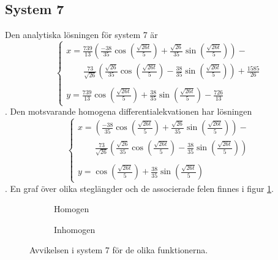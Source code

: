 \subsection{System 7}
Den analytiska lösningen för system 7 är
\begin{equation*}
    \begin{cases}
        x=\frac{739}{13}(\frac{-38}{35}\cos(\frac{\sqrt{26t}}{5})+\frac{\sqrt{26}}{35}\sin(\frac{\sqrt{26t}}{5}))-\\
        \qquad \frac{73}{\sqrt{26}}(\frac{\sqrt{26}}{35}\cos(\frac{\sqrt{26t}}{5})-\frac{38}{35}\sin(\frac{\sqrt{26t}}{5}))+\frac{1585}{26}\\
        \\[-7.5pt]
        y=\frac{739}{13}\cos(\frac{\sqrt{26t}}{5})+\frac{38}{35}\sin(\frac{\sqrt{26t}}{5})-\frac{726}{13}
    \end{cases}
\end{equation*}. Den motsvarande homogena differentialekvationen har lösningen 
\begin{equation*}
    \begin{cases}
        x=(\frac{-38}{35}\cos(\frac{\sqrt{26t}}{5})+\frac{\sqrt{26}}{35}\sin(\frac{\sqrt{26t}}{5}))-\\
        \qquad \frac{73}{\sqrt{26}}(\frac{\sqrt{26}}{35}\cos(\frac{\sqrt{26t}}{5})-\frac{38}{35}\sin(\frac{\sqrt{26t}}{5}))\\
        \\[-7.5pt]
        y=\cos(\frac{\sqrt{26t}}{5})+\frac{38}{35}\sin(\frac{\sqrt{26t}}{5})
    \end{cases}
\end{equation*}. En graf över olika steglängder och de associerade felen finnes i figur \ref{fig:diagram_sys_7_errors}.

\begin{figure}[h!]
    \centering

    \begin{subfigure}[h]{\textwidth}
        
        \caption{Homogen}
    \end{subfigure}
    \vspace{1em}\newline
    \begin{subfigure}[h]{\textwidth}
        
        \caption{Inhomogen}
    \end{subfigure}

    \caption{Avvikelsen i system 7 för de olika funktionerna.}
    \label{fig:diagram_sys_7_errors}
\end{figure}

